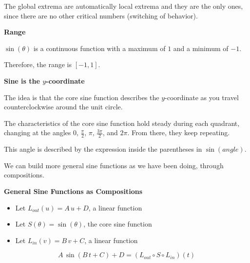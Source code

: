 \documentclass{ximera}
\begin{document}
The global extrema are automatically local extrema and they are the only ones, since there are no other critical numbers (switching of behavior).







\textbf{\textcolor{blue!55!black}{Range}}


$\sin(\theta)$ is a continuous function with a maximum of $1$ and a minimum of $-1$.

Therefore, the range is $[-1,1]$.






\begin{observation} \textbf{\textcolor{-red!75}{Sine is the $y$-coordinate}}

The idea is that the core sine function describes the $y$-coordinate as you travel counterclockwise around the unit circle.

The characteristics of the core sine function hold steady during each quadrant, changing at the angles $0$, $\frac{\pi}{2}$, $\pi$, $\frac{3\pi}{2}$, and $2\pi$. From there, they keep repeating.

This angle is described by the expression inside the parentheses in $\sin(angle)$.


\end{observation}





We can build more general sine functions as we have been doing, through compositions.



\begin{idea} \textbf{\textcolor{blue!55!black}{General Sine Functions as Compositions}} 


\begin{itemize}
\item Let $L_{out}(u) = A \, u + D$, a linear function
\item Let $S(\theta) = \sin(\theta)$, the core sine function
\item Let $L_{in}(v) = B \, v + C$, a linear function
\end{itemize}


\[
A \, \sin(B \, t + C) + D = (L_{out} \circ S \circ L_{in})(t)
\]



\end{idea}
\end{document}
